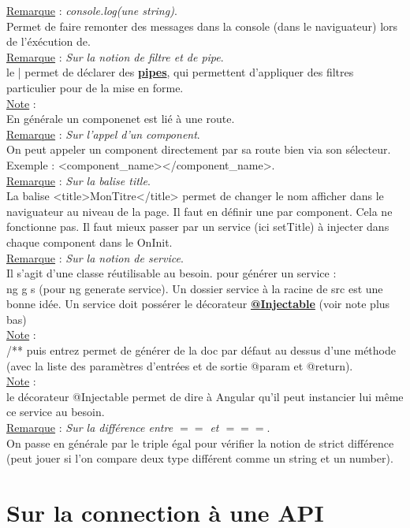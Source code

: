 \documentclass[a4paper,12pt,twoside]{article}
\newcommand{\urlcolor}{magenta}  %
\newcommand{\keycolor}{purple} %
\newcommand{\incode}[1]{{\footnotesize\ttfamily #1}} %
\newcommand{\rem}[2]{\noindent\underline{Remarque} : \textit{#1}.\\ \indent #2}
\newcommand{\note}[1]{\noindent\underline{Note} : \\ \indent #1}
\newcommand{\keyref}[2]{\hypersetup{urlcolor=\keycolor} \href{#1}{\textbf{#2}}\hypersetup{urlcolor=\urlcolor}}
\begin{document}
\rem{console.log(une string)}{Permet de faire remonter des messages dans la console (dans le naviguateur) lors de l'éxécution de.}\\

\rem{Sur la notion de filtre et de pipe}{le | permet de déclarer des \keyref{https://angular.io/guide/pipes}{pipes}, qui permettent d'appliquer des filtres particulier pour de la mise en forme.}\\

\note{En générale un componenet est lié à une route.}\\

\rem{Sur l'appel d'un component}{On peut appeler un component directement par sa route bien via son sélecteur.\\ Exemple : \incode{<component\_name></component\_name>}.}\\

\rem{Sur la balise title}{La balise \incode{<title>MonTitre</title>} permet de changer le nom afficher dans le naviguateur au niveau de la page. Il faut en définir une par component. Cela ne fonctionne pas. Il faut mieux passer par un service (ici setTitle) à injecter dans chaque component dans le OnInit.}\\

\rem{Sur la notion de service}{Il s'agit d'une classe réutilisable au besoin. pour générer un service :\\ \incode{ng g s} (pour \incode{ng generate service}). Un dossier service à la racine de \incode{src} est une bonne idée. Un service doit possérer le décorateur \keyref{https://angular.io/api/core/Injectable}{@Injectable} (voir note plus bas)}\\

\note{/** puis entrez permet de générer de la doc par défaut au dessus d'une méthode (avec la liste des paramètres d'entrées et de sortie @param et @return).}\\

\note{le décorateur \incode{@Injectable} permet de dire à Angular qu'il peut instancier lui même ce service au besoin.}\\

\rem{Sur la différence entre $==$ et $===$}{On passe en générale par le triple égal pour vérifier la notion de strict différence (peut jouer si l'on compare deux type différent comme un \incode{string} et un \incode{number}).}

\section{Sur la connection à une API}
\end{document}
